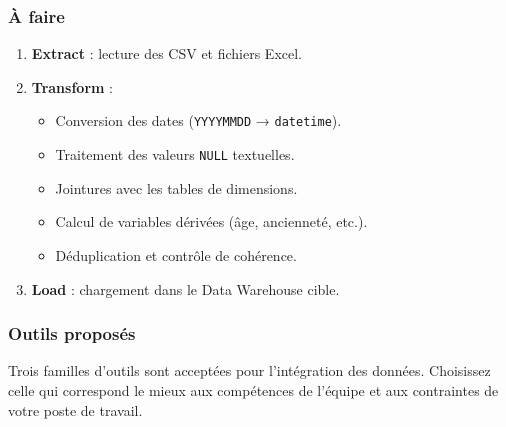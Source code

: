 \documentclass[11pt,a4paper]{article}
\providecommand{\tightlist}{\setlength{\itemsep}{0pt}\setlength{\parskip}{0pt}}
\begin{document}
\subsubsection{À faire}\label{uxe0-faire-2}

\begin{enumerate}
\def\labelenumi{\arabic{enumi}.}
\tightlist
\item
  \textbf{Extract} : lecture des CSV et fichiers Excel.
\item
  \textbf{Transform} :

  \begin{itemize}
  \tightlist
  \item
    Conversion des dates (\texttt{YYYYMMDD} → \texttt{datetime}).
  \item
    Traitement des valeurs \texttt{NULL} textuelles.
  \item
    Jointures avec les tables de dimensions.
  \item
    Calcul de variables dérivées (âge, ancienneté, etc.).
  \item
    Déduplication et contrôle de cohérence.
  \end{itemize}
\item
  \textbf{Load} : chargement dans le Data Warehouse cible.
\end{enumerate}

\subsubsection{Outils proposés}\label{outils-proposuxe9s-2}

Trois familles d'outils sont acceptées pour l'intégration des données.
Choisissez celle qui correspond le mieux aux compétences de l'équipe et
aux contraintes de votre poste de travail.
\end{document}
